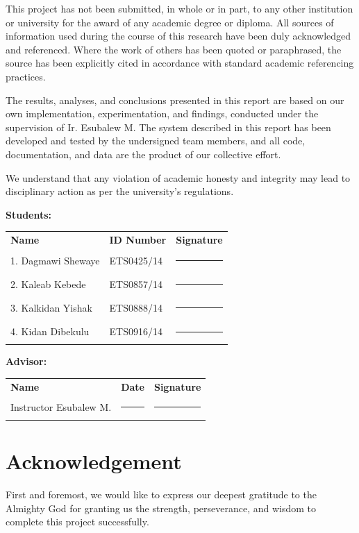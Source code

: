 \documentclass[12pt,a4paper,oneside]{report}
\begin{document}
This project has not been submitted, in whole or in part, to any other institution or university for the award of any academic degree or diploma. All sources of information used during the course of this research have been duly acknowledged and referenced. Where the work of others has been quoted or paraphrased, the source has been explicitly cited in accordance with standard academic referencing practices.

The results, analyses, and conclusions presented in this report are based on our own implementation, experimentation, and findings, conducted under the supervision of Ir. Esubalew M. The system described in this report has been developed and tested by the undersigned team members, and all code, documentation, and data are the product of our collective effort.

We understand that any violation of academic honesty and integrity may lead to disciplinary action as per the university's regulations.

\vspace{1cm}
\noindent\textbf{Students:}

\vspace{0.4cm}
\begin{tabular}{lll}
\textbf{Name} & \textbf{ID Number} & \textbf{Signature} \\[0.3cm]
1. Dagmawi Shewaye  & ETS0425/14 & \rule{5cm}{0.4pt} \\[0.3cm]
2. Kaleab Kebede    & ETS0857/14 & \rule{5cm}{0.4pt} \\[0.3cm]
3. Kalkidan Yishak  & ETS0888/14 & \rule{5cm}{0.4pt} \\[0.3cm]
4. Kidan Dibekulu   & ETS0916/14 & \rule{5cm}{0.4pt} \\
\end{tabular}

\vspace{1.2cm}
\noindent\textbf{Advisor:}

\vspace{0.4cm}
\begin{tabular}{lll}
\textbf{Name} & \textbf{Date} & \textbf{Signature} \\[0.3cm]
Instructor Esubalew M. & \rule{3cm}{0.4pt} & \rule{5cm}{0.4pt} \\
\end{tabular}
\chapter*{Acknowledgement}
First and foremost, we would like to express our deepest gratitude to the Almighty God for granting us the strength, perseverance, and wisdom to complete this project successfully.
\end{document}
